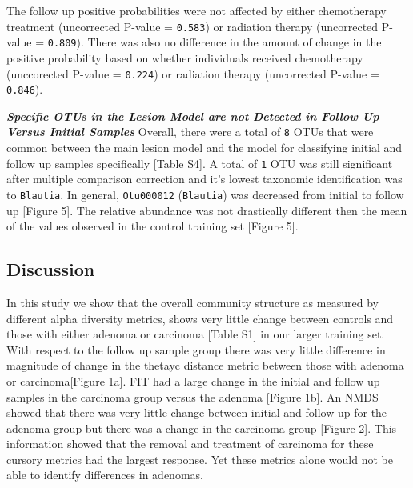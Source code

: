 \documentclass[12pt,]{article}
\begin{document}
The follow up positive probabilities were not affected by either
chemotherapy treatment (uncorrected P-value = \texttt{0.583}) or
radiation therapy (uncorrected P-value = \texttt{0.809}). There was also
no difference in the amount of change in the positive probability based
on whether individuals received chemotherapy (unccorected P-value =
\texttt{0.224}) or radiation therapy (uncorrected P-value =
\texttt{0.846}).

\textbf{\emph{Specific OTUs in the Lesion Model are not Detected in
Follow Up Versus Initial Samples}} Overall, there were a total of
\texttt{8} OTUs that were common between the main lesion model and the
model for classifying initial and follow up samples specifically
{[}Table S4{]}. A total of \texttt{1} OTU was still significant after
multiple comparison correction and it's lowest taxonomic identification
was to \texttt{Blautia}. In general, \texttt{Otu000012}
(\texttt{Blautia}) was decreased from initial to follow up {[}Figure
5{]}. The relative abundance was not drastically different then the mean
of the values observed in the control training set {[}Figure 5{]}.

\newpage

\subsection{Discussion}\label{discussion}

In this study we show that the overall community structure as measured
by different alpha diversity metrics, shows very little change between
controls and those with either adenoma or carcinoma {[}Table S1{]} in
our larger training set. With respect to the follow up sample group
there was very little difference in magnitude of change in the thetayc
distance metric between those with adenoma or carcinoma{[}Figure 1a{]}.
FIT had a large change in the initial and follow up samples in the
carcinoma group versus the adenoma {[}Figure 1b{]}. An NMDS showed that
there was very little change between initial and follow up for the
adenoma group but there was a change in the carcinoma group {[}Figure
2{]}. This information showed that the removal and treatment of
carcinoma for these cursory metrics had the largest response. Yet these
metrics alone would not be able to identify differences in adenomas.
\end{document}
